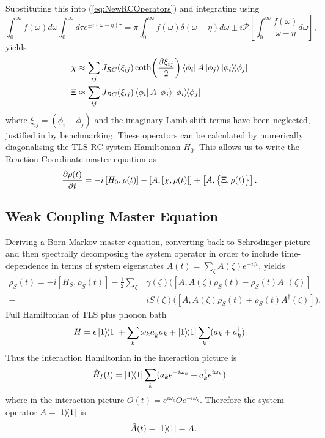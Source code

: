 \documentclass[]{article}
\begin{document}
\begin{itemize}
\begin{itemize}
Substituting this into (\ref{eq:NewRCOperators}) and integrating using 
\begin{equation}
	\label{eq:Sokhotski}
	\int_{0}^{\infty}f(\omega)d\omega\int_{0}^{\infty}d\tau e^{\pm i(\omega-\eta)\tau} = \pi\int_{0}^{\infty}f(\omega)\delta(\omega-\eta)d\omega \pm i \mathcal{P}\left[\int_{0}^{\infty}\frac{f(\omega)}{\omega-\eta}d\omega\right],
\end{equation}
yields
\begin{align}
	\label{eq:NewRCOperatorsDiscrete}
	\chi &\approx \sum_{ij}J_{RC}(\xi_{ij}) \coth(\frac{\beta \xi_{ij}}{2})\bra{\phi_i}A\ket{\phi_j}\dyad{\phi_i}{\phi_j}\\
	\Xi &\approx \sum_{ij}J_{RC}(\xi_{ij}) \bra{\phi_i}A\ket{\phi_j}\dyad{\phi_i}{\phi_j}
\end{align}
where $\xi_{ij} = (\phi_i-\phi_j)$ and the imaginary Lamb-shift terms have been neglected, justified in by benchmarking. These operators can be calculated by numerically diagonalising the TLS-RC system Hamiltonian $H_0$. This allows us to write the Reaction Coordinate master equation as
\begin{equation}
\pdv{\rho(t)}{t} = -i\left[H_0, \rho(t)\right] - \left[A, \left[\chi, \rho(t)\right]\right] + \left[A, \big\lbrace\Xi, \rho(t)\big\rbrace\right].
\end{equation}
\subsection{Weak Coupling Master Equation}
Deriving a Born-Markov master equation, converting back to Schr\"odinger picture and then spectrally decomposing the system operator in order to include time-dependence in terms of system eigenstates
$A(t)=\sum_{\zeta}A(\zeta)e^{-i\zeta t}$, yields
\begin{align}
\dot{\rho}_S(t) = -i[H_S, \rho_S(t)] -\frac{1}{2}\sum_{\zeta}&\gamma(\zeta)\big([A, A(\zeta)\rho_S(t)-\rho_S(t)A^{\dagger}(\zeta)]\\-&iS(\zeta)\big([A, A(\zeta)\rho_S(t)+\rho_S(t)A^{\dagger}(\zeta)]\big).
\end{align}
Full Hamiltonian of TLS plus phonon bath
\begin{equation}
H = \epsilon\dyad{1}{1} + \sum_{k}\omega_k a^{\dagger}_k a_k + \dyad{1}{1}\sum_{k} (a_k +a^{\dagger}_k) 
\end{equation}
Thus the interaction Hamiltonian in the interaction picture is
\begin{equation}
\tilde{H}_I(t) = \dyad{1}{1}\sum_{k} (a_ke^{-i\omega_k} +a^{\dagger}_ke^{i\omega_k}) 
\end{equation}
where in the interaction picture $O(t)=e^{i\omega_k}Oe^{-i\omega_k}$. Therefore the system operator $A = \dyad{1}$ is 
\begin{equation}
\quad \tilde{A}(t) = \dyad{1} = A.
\end{equation}


\end{itemize}
\end{itemize}
\end{document}
